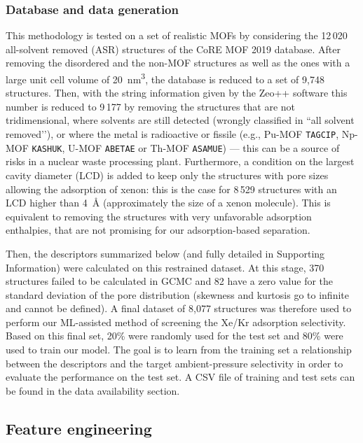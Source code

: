 \documentclass[main]{subfiles}
\begin{document}
\subsubsection{Database and data generation}

This methodology is tested on a set of realistic MOFs by considering the 12\,020 all-solvent removed (ASR) structures of the CoRE MOF 2019 database\autocite{Chung_2019}. After removing the disordered and the non-MOF structures as well as the ones with a large unit cell volume of \SI{20}{\cubic\nano\meter}, the database is reduced to a set of 9,748 structures. Then, with the string information given by the Zeo++ software\autocite{zeopp_Willems2012} this number is reduced to 9\,177 by removing the structures that are not tridimensional, where solvents are still detected (wrongly classified in ``all solvent removed’’), or where the metal is radioactive or fissile (e.g., Pu-MOF \texttt{TAGCIP}\autocite{Diwu_2010}, Np-MOF \texttt{KASHUK}\autocite{Martin_2017}, U-MOF \texttt{ABETAE}\autocite{Jouffret_2011} or Th-MOF \texttt{ASAMUE}\autocite{Liang_2016}) --- this can be a source of risks in a nuclear waste processing plant. Furthermore, a condition on the largest cavity diameter (LCD) is added to keep only the structures with pore sizes allowing the adsorption of xenon: this is the case for 8\,529 structures with an LCD higher than \SI{4}{\angstrom} (approximately the size of a xenon molecule). This is equivalent to removing the structures with very unfavorable adsorption enthalpies, that are not promising for our adsorption-based separation.

Then, the descriptors summarized below (and fully detailed in Supporting Information) were calculated on this restrained dataset. At this stage, 370 structures failed to be calculated in GCMC and 82 have a zero value for the standard deviation of the pore distribution (skewness and kurtosis go to infinite and cannot be defined). A final dataset of 8,077 structures was therefore used to perform our ML-assisted method of screening the Xe/Kr adsorption selectivity. Based on this final set, {20\%} were randomly used for the test set and {80\%} were used to train our model. The goal is to learn from the training set a relationship between the descriptors and the target ambient-pressure selectivity in order to evaluate the performance on the test set. A CSV file of training and test sets can be found in the data availability section.

\subsection{Feature engineering}
\end{document}
